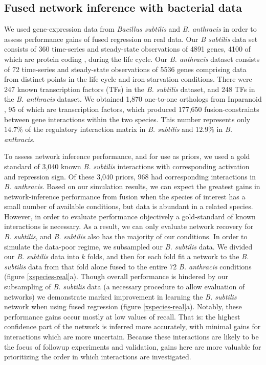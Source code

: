 \documentclass[11pt]{article}
\begin{document}
\subsection{Fused network inference with bacterial data}
We used gene-expression data from \textit{Bacillus subtilis} and \textit{B. anthracis} in order to assess performance gains of fused regression on real data. 
Our \textit{B subtilis} data set consists of 360 time-series and steady-state observations of 4891 genes, 4100 of which are protein coding \cite{kunst_complete_1997}, during the life cycle.
Our \textit{\textit{B. anthracis}} dataset consists of 72 time-series and steady-state observations of 5536 genes comprising data from distinct points in the life cycle and iron-starvation conditions. 
There were 247 known transcription factors (TFs) in the \textit{\textit{B. subtilis}} dataset, and 248 TFs in the \textit{B. anthracis} dataset.
We obtained 1,870 one-to-one orthologs from Inparanoid \cite{ostlund_inparanoid_2010}, 95 of which are transcription factors, which produced 177,650 fusion-constraints between gene interactions within the two species. 
This number represents only $14.7\%$ of the regulatory interaction matrix in \textit{B. subtilis} and $12.9\%$ in \textit{B. anthracis}. 

To assess network inference performance, and for use as priors, we used a gold standard of 3,040 known \textit{B. subtilis} interactions with corresponding activation and repression sign. 
Of these 3,040 priors, 968 had corresponding interactions in \textit{B. anthracis}. 
Based on our simulation results, we can expect the greatest gains in network-inference performance from fusion when the species of interest has a small number of available conditions, but data is abundant in a related species. 
However, in order to evaluate performance objectively a gold-standard of known interactions is necessary. 
As a result, we can only evaluate network recovery for \textit{B. subtilis}, and \textit{B. subtilis} also has the majority of our conditions. 
In order to simulate the data-poor regime, we subsampled our \textit{B. subtilis} data. 
We divided our \textit{B. subtilis} data into $k$ folds, and then for each fold fit a network to the \textit{B. subtilis} data from that fold alone fused to the entire 72 \textit{B. anthracis} conditions (figure \ref{xspecies-real}a). 
Though overall performance is hindered by our subsampling of \textit{B. subtilis} data (a necessary procedure to allow evaluation of networks) we demonstrate marked improvement in learning the \textit{B. subtilis} network when using fused regression (figure \ref{xspecies-real}a). 
Notably, these performance gains occur mostly at low values of recall. That is: the highest confidence part of the network is inferred more accurately, with minimal gains for interactions which are more uncertain. Because these interactions are likely to be the focus of followup experiments and validation, gains here are more valuable for prioritizing the order in which interactions are investigated. 
\end{document}
